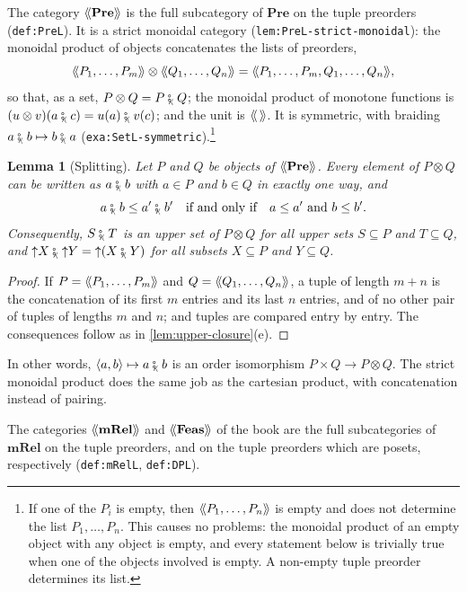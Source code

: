 \documentclass[11pt,a4paper]{article}
\theoremstyle{plain}
\newtheorem{lemma}[theorem]{Lemma}
\theoremstyle{definition}
\theoremstyle{remark}
\newcommand{\Cat}[1]{\mathbf{#1}}
\newcommand{\Pre}{\Cat{Pre}}
\newcommand{\mRel}{\Cat{mRel}}
\newcommand{\Feas}{\Cat{Feas}}
\providecommand{\llangle}{\mathopen{\langle\mkern-3.5mu\langle}}
\providecommand{\rrangle}{\mathclose{\rangle\mkern-3.5mu\rangle}}
\newcommand{\tL}[1]{\llangle #1 \rrangle}
\newcommand{\tc}{\mathbin{\fatsemi_{\!\scriptscriptstyle\langle}}}
\newcommand{\tup}[1]{\langle #1 \rangle}
\newcommand{\up}{\mathord{\uparrow}}
\newcommand{\lbl}[1]{\nolinkurl{#1}}
\begin{document}
The category $\tL{\Pre}$ is the full subcategory of $\Pre$ on the tuple preorders (\lbl{def:PreL}).
It is a strict monoidal category (\lbl{lem:PreL-strict-monoidal}): the monoidal product of objects concatenates the lists of preorders,
\begin{equation*}
    \tL{P_1, \ldots, P_m} \otimes \tL{Q_1, \ldots, Q_n} = \tL{P_1, \ldots, P_m, Q_1, \ldots, Q_n},
\end{equation*}
so that, as a set, $P \otimes Q = P \tc Q$; the monoidal product of monotone functions is $(u \otimes v)(a \tc c) = u(a) \tc v(c)$; and the unit is $\tL{\,}$.
It is symmetric, with braiding $a \tc b \mapsto b \tc a$ (\lbl{exa:SetL-symmetric}).\footnote{If one of the $P_i$ is empty, then $\tL{P_1, \ldots, P_n}$ is empty and does not determine the list $P_1, \ldots, P_n$. This causes no problems: the monoidal product of an empty object with any object is empty, and every statement below is trivially true when one of the objects involved is empty. A non-empty tuple preorder determines its list.}

\begin{lemma}[Splitting]
    \label{lem:splitting}
    Let $P$ and $Q$ be objects of $\tL{\Pre}$.
    Every element of $P \otimes Q$ can be written as $a \tc b$ with $a \in P$ and $b \in Q$ in exactly one way, and
    \begin{equation*}
        a \tc b \leq a' \tc b' \quad \text{if and only if} \quad a \leq a' \text{ and } b \leq b'.
    \end{equation*}
    Consequently, $S \tc T$ is an upper set of $P \otimes Q$ for all upper sets $S \subseteq P$ and $T \subseteq Q$, and $\up X \tc \up Y = \up (X \tc Y)$ for all subsets $X \subseteq P$ and $Y \subseteq Q$.
\end{lemma}
\begin{proof}
    If $P = \tL{P_1, \ldots, P_m}$ and $Q = \tL{Q_1, \ldots, Q_n}$, a tuple of length $m + n$ is the concatenation of its first $m$ entries and its last $n$ entries, and of no other pair of tuples of lengths $m$ and $n$; and tuples are compared entry by entry.
    The consequences follow as in \cref{lem:upper-closure}(e).
\end{proof}

In other words, $\tup{a,b} \mapsto a \tc b$ is an order isomorphism $P \times Q \to P \otimes Q$.
The strict monoidal product does the same job as the cartesian product, with concatenation instead of pairing.

The categories $\tL{\mRel}$ and $\tL{\Feas}$ of the book are the full subcategories of $\mRel$ on the tuple preorders, and on the tuple preorders which are posets, respectively (\lbl{def:mRelL}, \lbl{def:DPL}).
\end{document}
